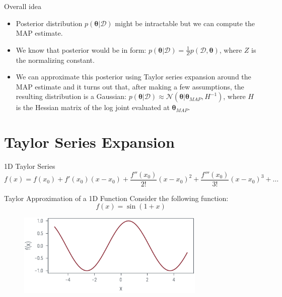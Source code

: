 \documentclass{beamer}
\begin{document}
\begin{frame}{Overall idea}
    \begin{itemize}
        \item Posterior distribution $p(\boldsymbol{\theta}| \mathcal{D})$ might be intractable but we can compute the MAP estimate.
        \item We know that posterior would be in form: $p(\boldsymbol{\theta}| \mathcal{D}) = \frac{1}{Z}p(\mathcal{D}, \boldsymbol{\theta})$, where $Z$ is the normalizing constant.
        \item We can approximate this posterior using Taylor series expansion around the MAP estimate and it turns out that, after making a few assumptions, the resulting distribution is a Gaussian: $p(\boldsymbol{\theta}| \mathcal{D}) \approx \mathcal{N}(\boldsymbol{\theta}|\boldsymbol{\theta}_{MAP}, H^{-1})$, where $H$ is the Hessian matrix of the log joint evaluated at $\boldsymbol{\theta}_{MAP}$.
    \end{itemize}
\end{frame}

\section{Taylor Series Expansion}

\begin{frame}{1D Taylor Series}
    \begin{equation*}
        f(x) = f(x_0) + f'(x_0)(x-x_0) + \frac{f''(x_0)}{2!}(x-x_0)^2 + \frac{f'''(x_0)}{3!}(x-x_0)^3 + \dots
    \end{equation*}

\end{frame}

\begin{frame}{Taylor Approximation of a 1D Function}
    Consider the following function:
    \begin{equation*}
        f(x) = \sin(1+x)
    \end{equation*}
    \begin{figure}
        \includegraphics[width=0.8\textwidth]{../figures/laplace-approx/sin.pdf}
    \end{figure}

\end{frame}
\end{document}

